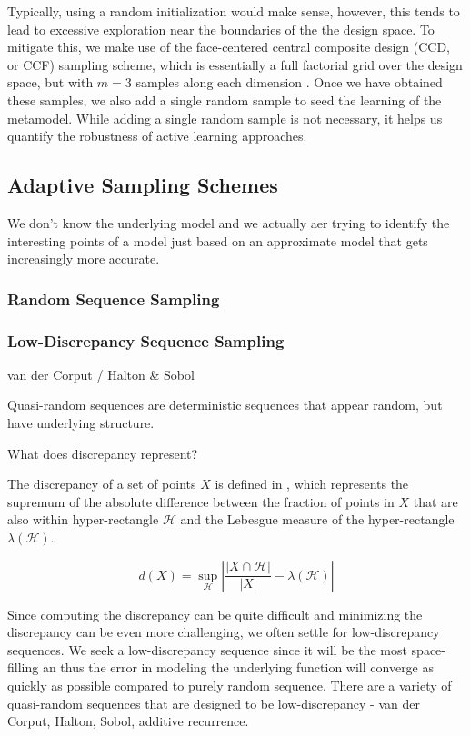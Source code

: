 \documentclass[conference]{IEEEtran}
\begin{document}
	Typically, using a random initialization would make sense, however, this tends to lead to excessive exploration near the boundaries of the the design space. To mitigate this, we make use of the face-centered central composite design (CCD, or CCF) sampling scheme, which is essentially a full factorial grid over the design space, but with $m=3$ samples along each dimension \cite{CentralCCD}. Once we have obtained these samples, we also add a single random sample to seed the learning of the metamodel. While adding a single random sample is not necessary, it helps us quantify the robustness of active learning approaches.
	
    \subsection{Adaptive Sampling Schemes}
	
	We don't know the underlying model and we actually aer trying to identify the interesting points of a model just based on an approximate model that gets increasingly more accurate.

	
	\subsubsection{Random Sequence Sampling}
	
	\subsubsection{Low-Discrepancy Sequence Sampling}
	
	van der Corput / Halton & Sobol
	
	Quasi-random sequences are deterministic sequences that appear random, but have underlying structure. 
	
	What does discrepancy represent? \cite{kuipers1974uniform}
	
	The discrepancy of a set of points $X$ is defined in , which represents the supremum of the absolute difference between the fraction of points in $X$ that are also within hyper-rectangle $\mathcal{H}$ and the Lebesgue measure of the hyper-rectangle $\lambda(\mathcal{H})$.
	
	\begin{equation}
	    \label{eqn:discrepancy}
	    d(X) = \sup_\mathcal{H} \left| \frac{|X \cap \mathcal{H}|}{|X|} - \lambda(\mathcal{H}) \right|
	\end{equation}

	Since computing the discrepancy can be quite difficult and minimizing the discrepancy  can be even more challenging, we often settle for low-discrepancy sequences. We seek a low-discrepancy sequence since it will be the most space-filling an thus the error in modeling the underlying function will converge as quickly as possible compared to purely random sequence. There are a variety of quasi-random sequences that are designed to be low-discrepancy - van der Corput, Halton, Sobol, additive recurrence.
\end{document}
